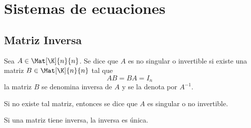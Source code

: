 \documentclass[compacto,10pt]{pubciencias-notas}
\begin{document}
\encabezado

\vspace*{-8mm}

\setcounter{section}{1}
\section{Sistemas de ecuaciones}
\setcounter{subsection}{2}
\subsection{Matriz Inversa}

\begin{defi}\label{Sem03Clas02DefInv}
    Sea $A\in \Mat[\K]{n}{n}$. Se dice que $A$ es no singular o invertible si existe una matriz $B\in \Mat[\K]{n}{n}$ tal que 
    \[
        AB = BA = I_n
    \]
    la matriz $B$ se denomina inversa de $A$ y se la denota por $A^{-1}$. 
    
    \noindent Si no existe tal matriz, entonces se dice que $A$ es singular o no invertible. 
\end{defi}

\begin{prop}
    Si una matriz tiene inversa, la inversa es única. 
\end{prop}

\end{document}
